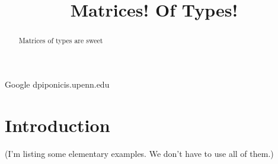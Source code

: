 \documentclass[authoryear,preprint]{sigplanconf}
\begin{document}


\title{Matrices! Of Types!}

           {Google}
           {dpiponicis.upenn.edu}

\maketitle

\begin{abstract}
Matrices of types are sweet
\end{abstract}




\section{Introduction}
\label{sec:introduction}

(I'm listing some elementary examples. We don't have to use all of them.)
\end{document}
